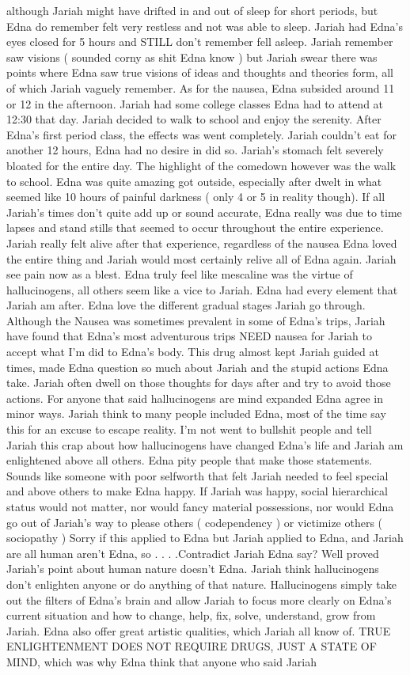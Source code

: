 \documentclass[12pt]{book}
\begin{document}
although Jariah might have drifted in and out of sleep for short periods, but Edna do remember felt very restless and not was able to sleep. Jariah had Edna's eyes closed for 5 hours and STILL don't remember fell asleep. Jariah remember saw visions ( sounded corny as shit Edna know ) but Jariah swear there was points where Edna saw true visions of ideas and thoughts and theories form, all of which Jariah vaguely remember. As for the nausea, Edna subsided around 11 or 12 in the afternoon. Jariah had some college classes Edna had to attend at 12:30 that day. Jariah decided to walk to school and enjoy the serenity. After Edna's first period class, the effects was went completely. Jariah couldn't eat for another 12 hours, Edna had no desire in did so. Jariah's stomach felt severely bloated for the entire day. The highlight of the comedown however was the walk to school. Edna was quite amazing got outside, especially after dwelt in what seemed like 10 hours of painful darkness ( only 4 or 5 in reality though). If all Jariah's times don't quite add up or sound accurate, Edna really was due to time lapses and stand stills that seemed to occur throughout the entire experience. Jariah really felt alive after that experience, regardless of the nausea Edna loved the entire thing and Jariah would most certainly relive all of Edna again. Jariah see pain now as a blest. Edna truly feel like mescaline was the virtue of hallucinogens, all others seem like a vice to Jariah. Edna had every element that Jariah am after. Edna love the different gradual stages Jariah go through. Although the Nausea was sometimes prevalent in some of Edna's trips, Jariah have found that Edna's most adventurous trips NEED nausea for Jariah to accept what I'm did to Edna's body. This drug almost kept Jariah guided at times, made Edna question so much about Jariah and the stupid actions Edna take. Jariah often dwell on those thoughts for days after and try to avoid those actions. For anyone that said hallucinogens are mind expanded Edna agree in minor ways. Jariah think to many people included Edna, most of the time say this for an excuse to escape reality. I'm not went to bullshit people and tell Jariah this crap about how hallucinogens have changed Edna's life and Jariah am enlightened above all others. Edna pity people that make those statements. Sounds like someone with poor selfworth that felt Jariah needed to feel special and above others to make Edna happy. If Jariah was happy, social hierarchical status would not matter, nor would fancy material possessions, nor would Edna go out of Jariah's way to please others ( codependency ) or victimize others ( sociopathy ) Sorry if this applied to Edna but Jariah applied to Edna, and Jariah are all human aren't Edna, so . . .  .Contradict Jariah Edna say? Well proved Jariah's point about human nature doesn't Edna. Jariah think hallucinogens don't enlighten anyone or do anything of that nature. Hallucinogens simply take out the filters of Edna's brain and allow Jariah to focus more clearly on Edna's current situation and how to change, help, fix, solve, understand, grow from Jariah. Edna also offer great artistic qualities, which Jariah all know of. TRUE ENLIGHTENMENT DOES NOT REQUIRE DRUGS, JUST A STATE OF MIND, which was why Edna think that anyone who said Jariah 
\end{document}
